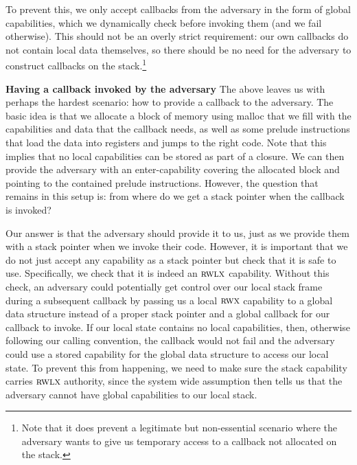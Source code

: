 \documentclass[format=acmsmall, review=true, screen=true]{acmart}
\newcommand{\plainperm}[1]{\textsc{#1}}
\newcommand{\rwx}{\plainperm{rwx}}
\newcommand{\rwlx}{\plainperm{rwlx}}
\newcommand{\itoplassug}[1]{}
\begin{document}
To prevent this, we only accept callbacks from the adversary in the form of
global capabilities, which we dynamically check before invoking them (and we
fail otherwise). This should not be an overly strict requirement: our own
callbacks do not contain local data themselves, so there should be no need for
the adversary to construct callbacks on the stack.\footnote{Note that it does
  prevent a legitimate but non-essential scenario where the adversary wants to
  give us temporary access to a callback not allocated on the stack.}
\itoplassug{Maybe a word on arguments passed from the adversary to us that we pass on to a callback given by the adversary (mentioned by reviewer E, popl, see tex comment.)}


\textbf{Having a callback invoked by the adversary} The above leaves us with
perhaps the hardest scenario: how to provide a callback to the adversary. The
basic idea is that we allocate a block of memory using malloc that we fill with
the capabilities and data that the callback needs, as well as some
prelude instructions that load the data into registers and jumps to the right
code. Note that this implies that no local capabilities can be stored as part of
a closure. We can then provide the adversary with an enter-capability covering
the allocated block and pointing to the contained prelude instructions. However,
the question that remains in this setup is: from where do we get a stack pointer when
the callback is invoked?

Our answer is that the adversary should provide it to us, just as we provide
them with a stack pointer when we invoke their code. However, it is important
that we do not just accept any capability as a stack pointer but check that it
is safe to use. Specifically, we check that it is indeed an $\rwlx$ capability. Without
this check, an adversary could potentially get control over our local stack
frame during a subsequent callback by passing us a local $\rwx$ capability to a global data
structure instead of a proper stack pointer
and a global callback for our callback to invoke. If our local state contains no
local capabilities, then, otherwise following our calling convention, the callback would
not fail and the adversary could use a stored capability for the global data
structure to access our local state. To prevent this from happening, we need to
make sure the stack capability carries $\rwlx$ authority, since the system wide assumption then
tells us that the adversary cannot have global capabilities to our local stack.
\end{document}
